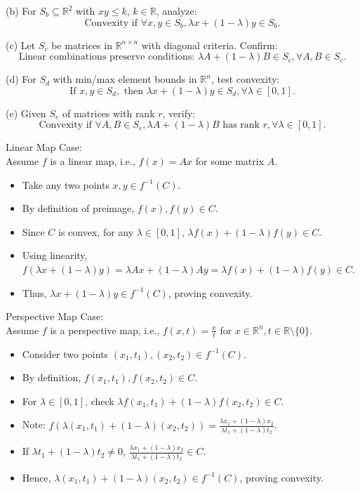 \documentclass{exam}
\begin{document}
\begin{questions}
(b) For \( S_b \subseteq \mathbb{R}^2 \) with \( xy \leq k \), \( k \in \mathbb{R} \), analyze:
\[ \text{Convexity if } \forall x, y \in S_b, \lambda x + (1 - \lambda)y \in S_b. \]

(c) Let \( S_c \) be matrices in \( \mathbb{R}^{n \times n} \) with diagonal criteria. Confirm:
\[ \text{Linear combinations preserve conditions: } \lambda A + (1 - \lambda)B \in S_c, \forall A, B \in S_c. \]

(d) For \( S_d \) with min/max element bounds in \( \mathbb{R}^n \), test convexity:
\[ \text{If } x, y \in S_d, \text{ then } \lambda x + (1 - \lambda)y \in S_d, \forall \lambda \in [0,1]. \]

(e) Given \( S_e \) of matrices with rank \( r \), verify:
\[ \text{Convexity if } \forall A, B \in S_e, \lambda A + (1 - \lambda)B \text{ has rank } r, \forall \lambda \in [0,1]. \]




Linear Map Case: \\
Assume \( f \) is a linear map, i.e., \( f(x) = Ax \) for some matrix \( A \).
\begin{itemize}
    \item Take any two points \( x, y \in f^{-1}(C) \).
    \item By definition of preimage, \( f(x), f(y) \in C \).
    \item Since \( C \) is convex, for any \( \lambda \in [0,1] \), \( \lambda f(x) + (1-\lambda)f(y) \in C \).
    \item Using linearity, \( f(\lambda x + (1-\lambda)y) = \lambda Ax + (1-\lambda)Ay = \lambda f(x) + (1-\lambda)f(y) \in C \).
    \item Thus, \( \lambda x + (1-\lambda)y \in f^{-1}(C) \), proving convexity.
\end{itemize}

Perspective Map Case: \\
Assume \( f \) is a perspective map, i.e., \( f(x, t) = \frac{x}{t} \) for \( x \in \mathbb{R}^n, t \in \mathbb{R} \setminus \{0\} \).
\begin{itemize}
    \item Consider two points \( (x_1, t_1), (x_2, t_2) \in f^{-1}(C) \).
    \item By definition, \( f(x_1, t_1), f(x_2, t_2) \in C \).
    \item For \( \lambda \in [0,1] \), check \( \lambda f(x_1, t_1) + (1-\lambda)f(x_2, t_2) \in C \).
    \item Note: \( f(\lambda(x_1, t_1) + (1-\lambda)(x_2, t_2)) = \frac{\lambda x_1 + (1-\lambda)x_2}{\lambda t_1 + (1-\lambda)t_2} \).
    \item If \( \lambda t_1 + (1-\lambda)t_2 \neq 0 \), \( \frac{\lambda x_1 + (1-\lambda)x_2}{\lambda t_1 + (1-\lambda)t_2} \in C \).
    \item Hence, \( \lambda(x_1, t_1) + (1-\lambda)(x_2, t_2) \in f^{-1}(C) \), proving convexity.
\end{itemize}


\end{questions}
\end{document}
